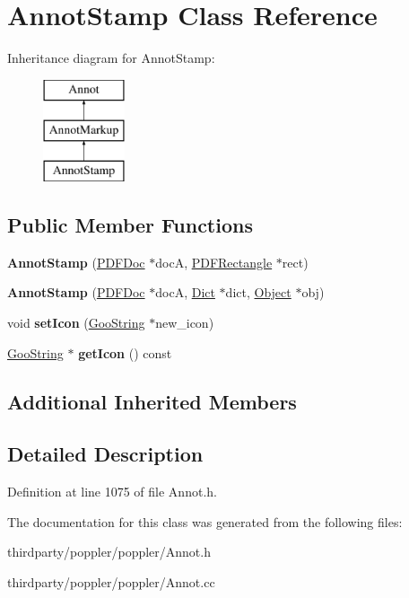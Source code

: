 \hypertarget{class_annot_stamp}{}\section{Annot\+Stamp Class Reference}
\label{class_annot_stamp}
Inheritance diagram for Annot\+Stamp\+:\begin{figure}[H]
\begin{center}
\leavevmode
\includegraphics[height=3.000000cm]{class_annot_stamp}
\end{center}
\end{figure}
\subsection*{Public Member Functions}
\begin{DoxyCompactItemize}
\item 
\mbox{\label{class_annot_stamp_a349372ecfd6870cffb438cbe10567b89}} 
{\bfseries Annot\+Stamp} (\hyperlink{class_p_d_f_doc}{P\+D\+F\+Doc} $\ast$docA, \hyperlink{class_p_d_f_rectangle}{P\+D\+F\+Rectangle} $\ast$rect)
\item 
\mbox{\label{class_annot_stamp_a46e0a5a2bce5f8fed13fabf4a9605c5b}} 
{\bfseries Annot\+Stamp} (\hyperlink{class_p_d_f_doc}{P\+D\+F\+Doc} $\ast$docA, \hyperlink{class_dict}{Dict} $\ast$dict, \hyperlink{class_object}{Object} $\ast$obj)
\item 
\mbox{\label{class_annot_stamp_a85f1c72ad7de15362aecfff01d213f05}} 
void {\bfseries set\+Icon} (\hyperlink{class_goo_string}{Goo\+String} $\ast$new\+\_\+icon)
\item 
\mbox{\label{class_annot_stamp_a6810d808cbab0da192d09d9721ef1202}} 
\hyperlink{class_goo_string}{Goo\+String} $\ast$ {\bfseries get\+Icon} () const
\end{DoxyCompactItemize}
\subsection*{Additional Inherited Members}


\subsection{Detailed Description}


Definition at line 1075 of file Annot.\+h.



The documentation for this class was generated from the following files\+:\begin{DoxyCompactItemize}
\item 
thirdparty/poppler/poppler/Annot.\+h\item 
thirdparty/poppler/poppler/Annot.\+cc\end{DoxyCompactItemize}
